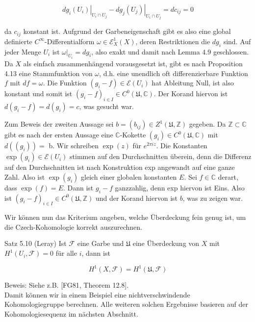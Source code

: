 \documentclass[10pt, letterpaper]{article}
\begin{document}
$$
\left.d g_{i}\left(U_{i}\right)\right|_{U_{i} \cap U_{j}}-\left.d g_{j}\left(U_{j}\right)\right|_{U_{i} \cap U_{j}}=d c_{i j}=0
$$

da $c_{i j}$ konstant ist. Aufgrund der Garbeneigenschaft gibt es also eine global definierte $C^{\infty}$-Differentialform $\omega \in \mathcal{E}_{X}^{1}(X)$, deren Restriktionen die $d g_{i}$ sind. Auf jeder Menge $U_{i}$ ist $\left.\omega\right|_{U_{i}}=d g_{i}$, also exakt und damit nach Lemma 4.9 geschlossen. Da $X$ als einfach zusammenhängend vorausgesetzt ist, gibt es nach Proposition 4.13 eine Stammfunktion von $\omega$, d.h. eine unendlich oft differenzierbare Funktion $f$ mit $d f=\omega$. Die Funktion $\left(g_{i}-f\right) \in \mathcal{E}\left(U_{i}\right)$ hat Ableitung Null, ist also konstant und somit ist $\left(g_{i}-f\right)_{i \in I} \in C^{0}(\mathfrak{U}, \mathbb{C})$. Der Korand hiervon ist $d\left(g_{i}-f\right)=d\left(g_{i}\right)=c$, was gesucht war.

Zum Beweis der zweiten Aussage sei $b=\left(b_{i j}\right) \in Z^{1}(\mathfrak{U}, \mathbb{Z})$ gegeben. Da $\mathbb{Z} \subset \mathbb{C}$ gibt es nach der ersten Aussage eine $\mathbb{C}$-Kokette $\left(g_{i}\right) \in C^{0}(\mathfrak{U}, \mathbb{C})$ mit $d\left(\left(g_{i}\right)\right)=$ b. Wir schreiben $\exp (z)$ für $e^{2 \pi i z}$. Die Konstanten $\exp \left(g_{i}\right) \in \mathcal{E}\left(U_{i}\right)$ stimmen auf den Durchschnitten überein, denn die Differenz auf den Durchschnitten ist nach Konstruktion exp angewandt auf eine ganze Zahl. Also ist $\exp \left(g_{i}\right)$ gleich einer globalen konstanten $E$. Sei $f \in \mathbb{C}$ derart, dass $\exp (f)=E$. Dann ist $g_{i}-f$ ganzzahlig, denn exp hiervon ist Eins. Also ist $\left(g_{i}-f\right)_{i \in I} \in C^{0}(\mathfrak{U}, \mathbb{Z})$ und der Korand hiervon ist $b$, was zu zeigen war.

Wir können nun das Kriterium angeben, welche Überdeckung fein genug ist, um die Czech-Kohomologie korrekt auszurechnen.

Satz 5.10 (Leray) Ist $\mathcal{F}$ eine Garbe und $\mathfrak{U}$ eine Überdeckung von $X$ mit $H^{1}\left(U_{i}, \mathcal{F}\right)=0$ für alle $i$, dann ist

$$
H^{1}(X, \mathcal{F})=H^{1}(\mathfrak{U}, \mathcal{F})
$$

Beweis: Siehe z.B. [FG81, Theorem 12.8].\\
Damit können wir in einem Beispiel eine nichtverschwindende Kohomologiegruppe berechnen. Alle weiteren solchen Ergebnisse basieren auf der Kohomologiesequenz im nächsten Abschnitt.
\end{document}
